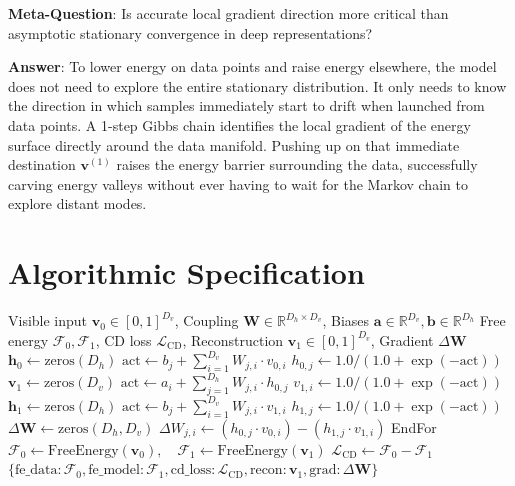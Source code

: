 \documentclass[11pt,a4paper]{article}
\theoremstyle{definition}
\begin{document}
\textbf{Meta-Question}: Is accurate local gradient direction more critical than asymptotic stationary convergence in deep representations?

\textbf{Answer}: To lower energy on data points and raise energy elsewhere, the model does not need to explore the entire stationary distribution. It only needs to know the direction in which samples immediately start to drift when launched from data points. A 1-step Gibbs chain identifies the local gradient of the energy surface directly around the data manifold. Pushing up on that immediate destination $\mathbf{v}^{(1)}$ raises the energy barrier surrounding the data, successfully carving energy valleys without ever having to wait for the Markov chain to explore distant modes.

\section{Algorithmic Specification}

\begin{algorithm}[H]
\caption{Restricted Boltzmann Machine Contrastive Divergence CD-1 Pass}
\label{alg:ebm}
\begin{algorithmic}[1]
\Require Visible input $\mathbf{v}_0 \in [0, 1]^{D_v}$, Coupling $\mathbf{W} \in \mathbb{R}^{D_h \times D_v}$, Biases $\mathbf{a} \in \mathbb{R}^{D_v}, \mathbf{b} \in \mathbb{R}^{D_h}$
\Ensure Free energy $\mathcal{F}_0, \mathcal{F}_1$, CD loss $\mathcal{L}_{\text{CD}}$, Reconstruction $\mathbf{v}_1 \in [0, 1]^{D_v}$, Gradient $\Delta \mathbf{W}$
\State $\mathbf{h}_0 \gets \text{zeros}(D_h)$
    \State $\text{act} \gets b_j + \sum_{i=1}^{D_v} W_{j, i} \cdot v_{0, i}$
    \State $h_{0, j} \gets 1.0 / (1.0 + \exp(-\text{act}))$
\EndFor
\State $\mathbf{v}_1 \gets \text{zeros}(D_v)$
    \State $\text{act} \gets a_i + \sum_{j=1}^{D_h} W_{j, i} \cdot h_{0, j}$
    \State $v_{1, i} \gets 1.0 / (1.0 + \exp(-\text{act}))$
\EndFor
\State $\mathbf{h}_1 \gets \text{zeros}(D_h)$
    \State $\text{act} \gets b_j + \sum_{i=1}^{D_v} W_{j, i} \cdot v_{1, i}$
    \State $h_{1, j} \gets 1.0 / (1.0 + \exp(-\text{act}))$
\EndFor
\State $\Delta \mathbf{W} \gets \text{zeros}(D_h, D_v)$
        \State $\Delta W_{j, i} \gets (h_{0, j} \cdot v_{0, i}) - (h_{1, j} \cdot v_{1, i})$
    \EndFor
EndFor
\State $\mathcal{F}_0 \gets \text{FreeEnergy}(\mathbf{v}_0), \quad \mathcal{F}_1 \gets \text{FreeEnergy}(\mathbf{v}_1)$
\State $\mathcal{L}_{\text{CD}} \gets \mathcal{F}_0 - \mathcal{F}_1$
\State \Return $\{\text{fe\_data}: \mathcal{F}_0, \text{fe\_model}: \mathcal{F}_1, \text{cd\_loss}: \mathcal{L}_{\text{CD}}, \text{recon}: \mathbf{v}_1, \text{grad}: \Delta \mathbf{W}\}$
\end{algorithmic}
\end{algorithm}
\end{document}
